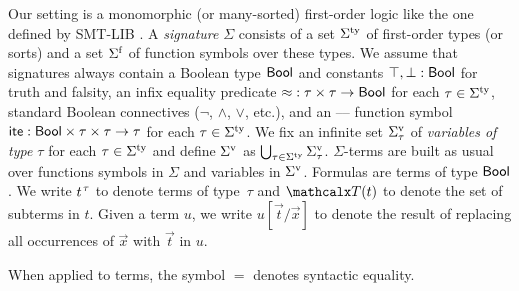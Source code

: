 Our setting is a monomorphic (or many-sorted) first-order logic
like the one defined by SMT-LIB \cite{smtlib25}.
A \emph{signature} $\Sigma$ consists of
a set $\stypes{\Sigma}$ of %
first-order types
%
(or sorts) and a set $\sfuns{\Sigma}$ of function symbols over these types.
We assume that signatures always contain a Boolean type $\mathsf{Bool}$ and constants
$\top, \bot : \mathsf{Bool}$ for truth and falsity,
an infix equality predicate ${\approx} : \tau \times \tau \to \mathsf{Bool}$
for each $\tau \in \stypes{\Sigma}$,
standard Boolean connectives ($\neg$, $\wedge$, $\vee$, etc.),
and an ---- function symbol
$\mathsf{ite} : \mathsf{Bool} \times \tau \times \tau \rightarrow \tau$
for each $\tau \in \stypes{\Sigma}$.
%
We fix an infinite set $\svars{\Sigma}_\tau$ of \emph{variables of type $\tau$}
for each $\tau \in \stypes{\Sigma}$ and
define $\svars{\Sigma}$ as $\bigcup_{\tau \in \stypes{\Sigma}} \svars{\Sigma}_\tau$.
$\Sigma$-terms are built as usual over functions symbols in $\Sigma$ and variables in $\svars{\Sigma}$.
%
Formulas are terms of type $\mathsf{Bool}$.
We write $t\typ{\tau}$ to denote %
terms of type~$\tau$ and $\terms( t )$ to denote the set of subterms in $t$.
Given a term $u$, we write $u[\vec t/\vec x]$ to denote the result of replacing
all occurrences of $\vec x$ with $\vec t$ in $u$.
\begin{rep}When applied to terms, the symbol $=$ denotes syntactic equality.\end{rep}


